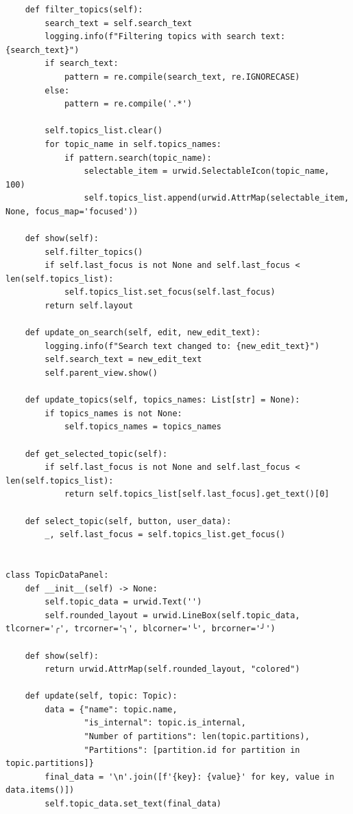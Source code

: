 \documentclass[10pt , a4paper]{report}
\newenvironment{code}{\captionsetup{type=listing}}{}
\begin{document}
\begin{code}
\begin{verbatim}
    def filter_topics(self):
        search_text = self.search_text
        logging.info(f"Filtering topics with search text: {search_text}")
        if search_text:
            pattern = re.compile(search_text, re.IGNORECASE)
        else:
            pattern = re.compile('.*')
        
        self.topics_list.clear()
        for topic_name in self.topics_names:
            if pattern.search(topic_name):
                selectable_item = urwid.SelectableIcon(topic_name, 100)
                self.topics_list.append(urwid.AttrMap(selectable_item, None, focus_map='focused'))

    def show(self):
        self.filter_topics()
        if self.last_focus is not None and self.last_focus < len(self.topics_list):
            self.topics_list.set_focus(self.last_focus)
        return self.layout
    
    def update_on_search(self, edit, new_edit_text):
        logging.info(f"Search text changed to: {new_edit_text}")
        self.search_text = new_edit_text
        self.parent_view.show()
            
    def update_topics(self, topics_names: List[str] = None):
        if topics_names is not None:
            self.topics_names = topics_names

    def get_selected_topic(self):
        if self.last_focus is not None and self.last_focus < len(self.topics_list):
            return self.topics_list[self.last_focus].get_text()[0]

    def select_topic(self, button, user_data):
        _, self.last_focus = self.topics_list.get_focus()


class TopicDataPanel:
    def __init__(self) -> None:
        self.topic_data = urwid.Text('')
        self.rounded_layout = urwid.LineBox(self.topic_data, tlcorner='╭', trcorner='╮', blcorner='╰', brcorner='╯')

    def show(self):
        return urwid.AttrMap(self.rounded_layout, "colored")

    def update(self, topic: Topic):
        data = {"name": topic.name,
                "is_internal": topic.is_internal,
                "Number of partitions": len(topic.partitions),
                "Partitions": [partition.id for partition in topic.partitions]}
        final_data = '\n'.join([f'{key}: {value}' for key, value in data.items()])
        self.topic_data.set_text(final_data)

  \end{verbatim}
\end{code}
\end{document}
